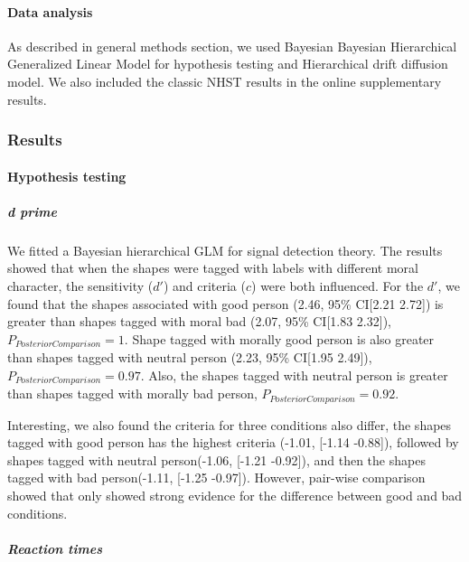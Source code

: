 \documentclass[
  english,
  man]{apa6}
\let\oldparagraph\paragraph
\renewcommand{\paragraph}[1]{\oldparagraph{#1}\mbox{}}
\let\oldsubparagraph\subparagraph
\renewcommand{\subparagraph}[1]{\oldsubparagraph{#1}\mbox{}}
\begin{document}
\hypertarget{data-analysis-1}{%
\paragraph{Data analysis}\label{data-analysis-1}}

As described in general methods section, we used Bayesian Bayesian Hierarchical Generalized Linear Model for hypothesis testing and Hierarchical drift diffusion model. We also included the classic NHST results in the online supplementary results.

\hypertarget{results}{%
\subsubsection{Results}\label{results}}

\hypertarget{hypothesis-testing}{%
\paragraph{Hypothesis testing}\label{hypothesis-testing}}

\hypertarget{d-prime}{%
\subparagraph{d prime}\label{d-prime}}

We fitted a Bayesian hierarchical GLM for signal detection theory. The results showed that when the shapes were tagged with labels with different moral character, the sensitivity (\(d'\)) and criteria (\(c\)) were both influenced. For the \(d'\), we found that the shapes associated with good person (2.46, 95\% CI{[}2.21 2.72{]}) is greater than shapes tagged with moral bad (2.07, 95\% CI{[}1.83 2.32{]}), \(P_{PosteriorComparison} = 1\). Shape tagged with morally good person is also greater than shapes tagged with neutral person (2.23, 95\% CI{[}1.95 2.49{]}), \(P_{PosteriorComparison} = 0.97\). Also, the shapes tagged with neutral person is greater than shapes tagged with morally bad person, \(P_{PosteriorComparison} = 0.92\).

Interesting, we also found the criteria for three conditions also differ, the shapes tagged with good person has the highest criteria (-1.01, {[}-1.14 -0.88{]}), followed by shapes tagged with neutral person(-1.06, {[}-1.21 -0.92{]}), and then the shapes tagged with bad person(-1.11, {[}-1.25 -0.97{]}). However, pair-wise comparison showed that only showed strong evidence for the difference between good and bad conditions.

\hypertarget{reaction-times}{%
\subparagraph{Reaction times}\label{reaction-times}}
\end{document}
